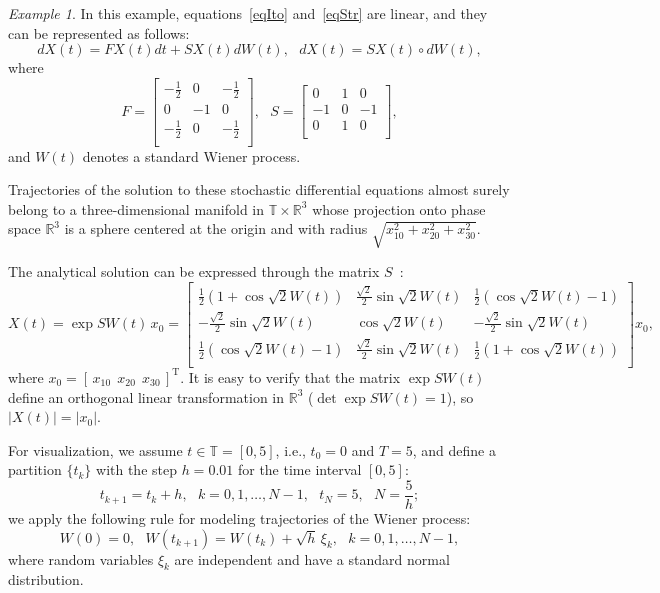 \documentclass[10pt,reqno]{amsart}
\newcommand{\trans}{{\scriptscriptstyle \mathrm{T}}}
\theoremstyle{plain}
\theoremstyle{remark}
\newtheorem{Example}{Example}
\begin{document}
\begin{Example}
In this example, equations~\eqref{eqIto} and~\eqref{eqStr} are linear, and they can be represented as follows:
\[
  dX(t) = F X(t) dt + S X(t) dW(t), \ \ \ dX(t) = S X(t) \circ dW(t),
\]
where
\[
  F = \left[ \begin{array}{ccc}
    -\tfrac{1}{2} & 0 & -\tfrac{1}{2} \\
    0 & -1 & 0 \\
    -\tfrac{1}{2} & 0 & -\tfrac{1}{2} \\
  \end{array} \right], \ \ \
  S = \left[ \begin{array}{ccc}
    0 & 1 & 0 \\
    -1 & 0 & -1 \\
    0 & 1 & 0 \\
  \end{array} \right],
\]
and $W(t)$ denotes a standard Wiener process.

Trajectories of the solution to these stochastic differential equations almost surely belong to a three-dimensional manifold in $\mathds{T} \times \mathds{R}^3$ whose projection onto phase space $\mathds{R}^3$ is a sphere centered at the origin and with radius $\sqrt{x_{10}^2 + x_{20}^2 + x_{30}^2}$.

The analytical solution can be expressed through the matrix $S$~\cite{KloPla_92, ArtAve_97}:
\[
  X(t) = \exp SW(t) \, x_0 = \left[
    \begin{array}{ccc}
      \frac{1}{2} (1 + \cos \sqrt{2}W(t)) & \frac{\sqrt{2}}{2} \sin \sqrt{2}W(t) & \frac{1}{2} (\cos \sqrt{2}W(t) - 1) \\
      -\frac{\sqrt{2}}{2} \sin \sqrt{2}W(t) & \cos \sqrt{2}W(t) & -\frac{\sqrt{2}}{2} \sin \sqrt{2}W(t) \\
      \frac{1}{2} (\cos \sqrt{2}W(t) - 1) & \frac{\sqrt{2}}{2} \sin \sqrt{2}W(t) & \frac{1}{2} (1 + \cos \sqrt{2}W(t)) \\
    \end{array}
  \right] x_0,
\]
where $x_0 = [ \, x_{10} \ \ x_{20} \ \ x_{30} \, ]^\trans$. It is easy to verify that the matrix $\exp S W(t)$ define an orthogonal linear transformation in $\mathds{R}^3$ ($\det \exp S W(t) = 1$), so $|X(t)| = |x_0|$.

For visualization, we assume $t \in \mathds{T} = [0,5]$, i.e., $t_0 = 0$ and $T = 5$, and define a partition $\{t_k\}$ with the step $h = 0.01$ for the time interval $[0,5]$:
\[
  t_{k+1} = t_k + h, \ \ \ k = 0,1,\dots,N-1, \ \ \ t_N = 5, \ \ \ N = \frac{5}{h};
\]
we apply the following rule for modeling trajectories of the Wiener process:
\[
  W(0) = 0, \ \ \ W(t_{k+1}) = W(t_k) + \sqrt{h} \, \xi_k, \ \ \ k = 0,1,\dots,N-1,
\]
where random variables $\xi_k$ are independent and have a standard normal distribution.


\end{Example}
\end{document}
